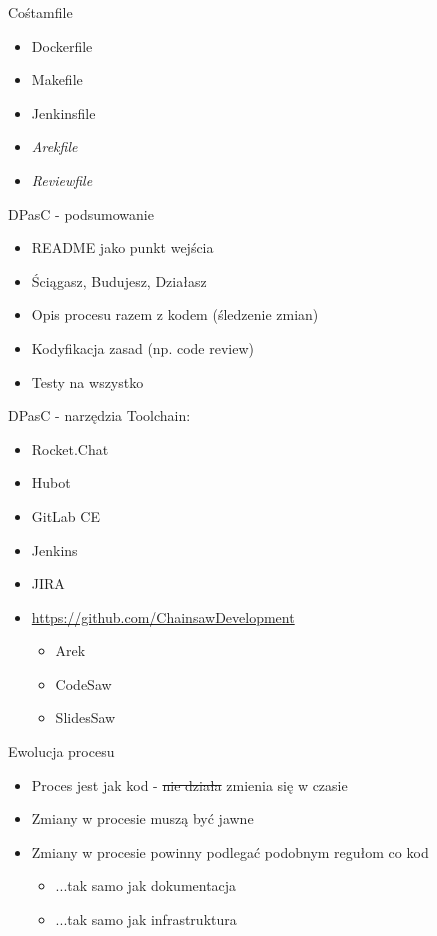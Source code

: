 \documentclass[ignorenonframetext]{beamer}
\begin{document}
\begin{frame}{Cośtamfile}
\begin{itemize}
	\item Dockerfile
	\item Makefile
	\item Jenkinsfile
	\item \textit{Arekfile}
	\item \textit{Reviewfile}
\end{itemize}
\end{frame}

\begin{frame}{DPasC - podsumowanie}
\begin{itemize}
	\item README jako punkt wejścia
	\item Ściągasz, Budujesz, Działasz	
	\item Opis procesu razem z kodem (śledzenie zmian)
	\item Kodyfikacja zasad (np. code review)
	\item Testy na wszystko
\end{itemize}
\end{frame}

\begin{frame}{DPasC - narzędzia}
Toolchain:
\begin{itemize}
	\item Rocket.Chat
	\item Hubot
	\item GitLab CE
	\item Jenkins
	\item JIRA
	\item \url{https://github.com/ChainsawDevelopment}
	\begin{itemize}
		\item Arek
		\item CodeSaw
		\item SlidesSaw
	\end{itemize}
\end{itemize}

\end{frame}

\begin{frame}{Ewolucja procesu}
\begin{itemize}
	\item Proces jest jak kod - \sout{nie działa} zmienia się w czasie
	\item Zmiany w procesie muszą być jawne
	\item Zmiany w procesie powinny podlegać podobnym regułom co kod
		\begin{itemize}
			\item ...tak samo jak dokumentacja
			\item ...tak samo jak infrastruktura
		\end{itemize}
\end{itemize}
\end{frame}
\end{document}
